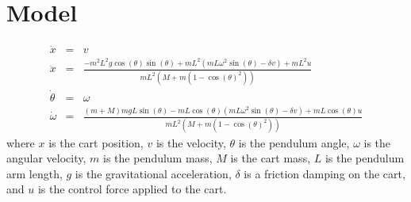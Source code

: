 \documentclass[]{article}
\begin{document}
	\section*{Model}
	\begin{eqnarray}
		\dot{x} & = & v \\
		\ddot{x}          & = & \frac{-m^2L^2g \cos(\theta)\sin(\theta) + mL^2(mL\omega^2 \sin(\theta)-\delta v)+mL^2u }{mL^2(M+m(1-\cos(\theta)^2))} \\
		\dot{\theta}  &= & \omega \\
		\dot{\omega}  &= & \frac{(m+M)mgL\sin(\theta)-mL\cos(\theta)(mL\omega^2\sin(\theta)-\delta v)+mL\cos(\theta)u}{mL^2(M+m(1-\cos(\theta)^2))}
	\end{eqnarray}
	where $x$ is the cart position, $v$ is the velocity, $\theta$ is the pendulum angle, $\omega$ is the angular velocity, $m$ is the pendulum mass, $M$ is the cart mass, $L$ is the pendulum arm length, $g$ is the gravitational acceleration, $\delta$ is a friction damping on the cart, and $u$ is the control force applied to the cart.
	


	
\end{document}

